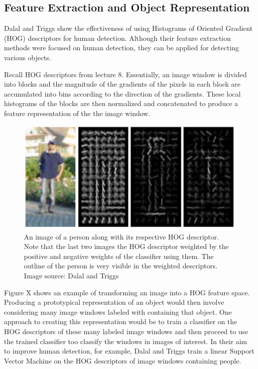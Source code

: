 \documentclass{article}
\begin{document}
\subsection{Feature Extraction and Object Representation}
Dalal and Triggs \cite{hog_human_detection} show the effectiveness of using Histograms of Oriented Gradient (HOG) descriptors for human detection. Although their feature extraction methods were focused on human detection, they can be applied for detecting various objects. 

Recall HOG descriptors from lecture 8. Essentially, an image window is divided into blocks and the magnitude of the gradients of the pixels in each block are accumulated into bins according to the direction of the gradients. These local histograms of the blocks are then normalized and concatenated to produce a feature representation of the the image window.

\begin{figure}[h]
	\includegraphics[width=\linewidth, scale=0.3]{person_template.png}
	\caption{An image of a person along with its respective HOG descriptor. Note that the last two images the HOG descriptor weighted by the positive and negative weights of the classifier using them. The outline of the person is very visible in the weighted descriptors. Image source: Dalal and Triggs \cite{hog_human_detection}}
\end{figure}

Figure X shows an example of transforming an image into a HOG feature space. Producing a prototypical representation of an object would then involve considering many image windows labeled with containing that object. One approach to creating this representation would be to train a classifier on the HOG descriptors of these many labeled image windows and then proceed to use the trained classifier too classify the windows in images of interest. In their aim to improve human detection, for example, Dalal and Triggs \cite{hog_human_detection} train a linear Support Vector Machine on the HOG descriptors of image windows containing people.
\end{document}
